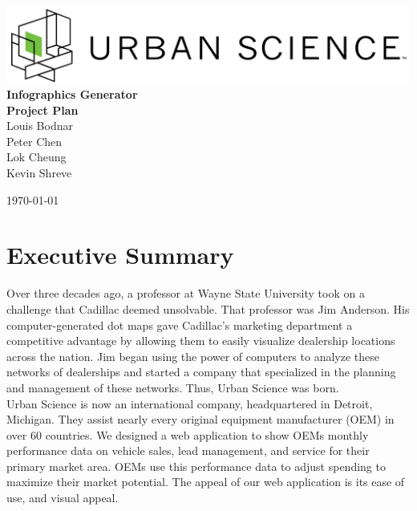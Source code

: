 \documentclass[11pt,a4paper,oneside]{article}
\begin{document}
\begin{titlepage}



\begin{center}

\includegraphics[width=1\textwidth]{images/sponsor-logo.png}\\[1cm]    

{ \huge \bfseries Infographics Generator}\\[0.4cm]
{ \large \bfseries Project Plan}\\[0.4cm]

Louis Bodnar\\
Peter Chen\\
Lok Cheung\\
Kevin Shreve\\


\vfill

{\large \today}

\end{center}

\end{titlepage}

\tableofcontents

\newpage



\section{Executive Summary}


Over three decades ago, a professor at Wayne State University took on a challenge that Cadillac deemed unsolvable. That professor was Jim Anderson. His computer-generated dot maps gave Cadillac's marketing department a competitive advantage by allowing them to easily visualize dealership locations across the nation. Jim began using the power of computers to analyze these networks of dealerships and started a company that specialized in the planning and management of these networks. Thus, Urban Science was born.\\


Urban Science is now an international company, headquartered in Detroit, Michigan. They assist nearly every original equipment manufacturer (OEM) in over 60 countries. We designed a web application to show OEMs monthly performance data on vehicle sales, lead management, and service for their primary market area. OEMs use this performance data to adjust spending to maximize their market potential. The appeal of our web application is its ease of use, and visual appeal.\\
\end{document}
